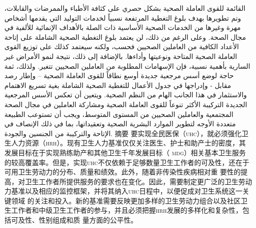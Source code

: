 \documentclass{article}
\begin{document}
القائمة للقوى
العاملة
الصحية بشكل
حصري على كثافة
الأطباء
والممرضات
والقابلات،
وتم تطويرها
بهدف بلوغ
التغطية
المرتفعة
نسبياً لخدمات
التوليد التي
يقدمها أشخاص
مهرة وغيرها من
الخدمات
الصحية
الأساسية ذات
الصلة
بالأهداف
الإنمائية
للألفية في
مجال الصحة.
وعلى الرغم من
ذلك، لن يعتمد
بلوغ التغطية
الصحية
الشاملة على
إتاحة الأعداد
الكافية من
العاملين
الصحيين فحسب،
ولكنه سيعتمد
كذلك على توزيع
القوى العاملة
الصحية
المتاحة
ونوعيتها
وأداءها.
بالإضافة إلى
ذلك، نتيجة
لنمو الأمراض
غير السارية
بأهمية نسبية،
فإن الإسهامات
المطلوبة من
العاملين
الصحيين تتغير.
ولذلك، ثمة
حاجة لوضع أسس
مرجعية جديدة
أوسع نطاقاً
للقوى العاملة
الصحية – وإطار
رصد مقابل -
وإدراجها في
جدول الأعمال
للتغطية
الصحية
الشاملة بغية
تسريع
الاهتمام
والاستثمار في
هذا الجانب
الهام من النظم
الصحية. ويتعين
أن تعكس الأسس
المرجعية
الجديدة
التركيبة
الأكثر تنوعاً
للقوى العاملة
الصحية
ومشاركة
العاملين في
مجال الصحة
المجتمعية
والعاملين
الصحيين من
المستوى
المتوسط، ويجب
أن تستوعب
الطبيعة
متعددة الأوجه
لتطوير
الموارد
البشرية
الصحية
وتعقيداتها،
بما في ذلك
الإنصاف في
الإتاحة
والتركيبة من
الجنسين
والجودة.
摘要
要实现全民医保（\textsc{uhc}），就必须强化卫生人力资源（\textsc{hrh}）。现有卫生人力基准仅仅关注医生、护士和助产士的密度，其发展目标在于实现熟练助产和其他卫生千年发展目标（
\textsc{mdg}）相关基本卫生服务的较高覆盖率。但是，实现\textsc{uhc}不仅依赖于足够数量卫生工作者的可及性，还在于可用卫生劳动力的分布、质量和绩效。此外，随着非传染性疾病相对重
要性的提高，对卫生工作者所提供服务的要求也在变化。因此，需要制定更广泛的卫生劳动力基准以及相应的监控框架，并将其纳入\textsc{uhc}日程中，以便促成对卫生系统这一关键领域
的关注和投入。新的基准需要反映更加多样的卫生劳动力组合以及社区卫生工作者和中级卫生工作者的参与，并且必须把握\textsc{hrh}发展的多样化和复杂性，包括可及性、性别组成和质
量方面的公平性。
\end{document}
